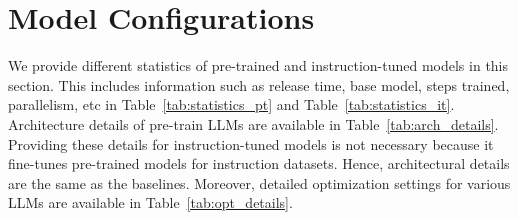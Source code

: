 \section{Model Configurations}
\label{Model_Configurations_}

We provide different statistics of pre-trained and instruction-tuned models in this section. This includes information such as release time, base model, steps trained, parallelism, etc in Table~\ref{tab:statistics_pt} and Table~\ref{tab:statistics_it}. Architecture details of pre-train LLMs are available in Table~\ref{tab:arch_details}. Providing these details for instruction-tuned models is not necessary because it fine-tunes pre-trained models for instruction datasets. Hence, architectural details are the same as the baselines. Moreover, detailed optimization settings for various LLMs are available in Table~\ref{tab:opt_details}.   


